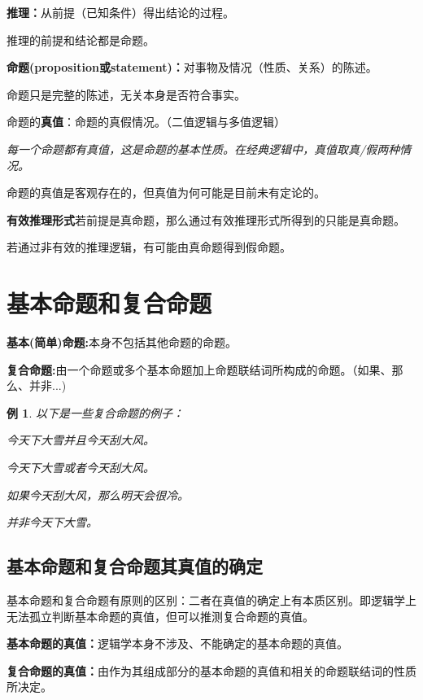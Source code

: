 \documentclass[12pt,onecolumn,a4paper]{book}
\newtheorem*{example}{例}
\numberwithin{table}{subsection}
\numberwithin{equation}{subsection}
\begin{document}
\textbf{推理：}从前提（已知条件）得出结论的过程。

推理的前提和结论都是命题。

\textbf{命题(proposition或statement)：}对事物及情况（性质、关系）的陈述。

命题只是完整的陈述，无关本身是否符合事实。

命题的\textbf{真值}：命题的真假情况。（二值逻辑与多值逻辑）

\emph{每一个命题都有真值，这是命题的基本性质。在经典逻辑中，真值取真/假两种情况。}

命题的真值是客观存在的，但真值为何可能是目前未有定论的。

\textbf{有效推理形式}若前提是真命题，那么通过有效推理形式所得到的只能是真命题。

若通过非有效的推理逻辑，有可能由真命题得到假命题。

\section{基本命题和复合命题}

\textbf{基本(简单)命题:}本身不包括其他命题的命题。

\textbf{复合命题:}由一个命题或多个基本命题加上命题联结词所构成的命题。（如果、那么、并非...)

\begin{example}
    以下是一些复合命题的例子：

    今天下大雪\emph{并且}今天刮大风。

    今天下大雪\emph{或者}今天刮大风。

    \emph{如果}今天刮大风，\emph{那么}明天会很冷。

    \emph{并非}今天下大雪。
\end{example}

\subsection*{基本命题和复合命题其真值的确定}

基本命题和复合命题有原则的区别：二者在真值的确定上有本质区别。即逻辑学上无法孤立判断基本命题的真值，但可以推测复合命题的真值。

\textbf{基本命题的真值：}逻辑学本身不涉及、不能确定的基本命题的真值。

\textbf{复合命题的真值：}由作为其组成部分的基本命题的真值和相关的命题联结词的性质所决定。
\end{document}
